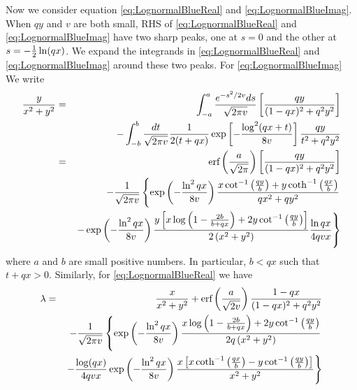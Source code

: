 \documentclass{article}
\begin{document}
Now we consider equation \eqref{eq:LognormalBlueReal} and
\eqref{eq:LognormalBlueImag}. When $q y$ and $v$ are both small, RHS
of \eqref{eq:LognormalBlueReal} and \eqref{eq:LognormalBlueImag} have
two sharp peaks, one at $s = 0$ and the other at $s = -{1 \over
  2}\ln(qx)$. We expand the integrands in
\eqref{eq:LognormalBlueReal} and \eqref{eq:LognormalBlueImag} around
these two peaks. For \eqref{eq:LognormalBlueImag} We write
\begin{eqnarray}
  {y \over x^2 + y^2} &=& \int_{-a}^{a} {e^{-s^2/2v}ds \over
    \sqrt{2\pi v}} \left[\frac{qy}{(1-qx)^2 + q^2y^2}\right] \label{eq:lambda}\\
  && - \int_{-b}^{b} {dt \over \sqrt{2\pi v}} {1 \over 2(t + q x)}
  \exp \left[-\frac{\log ^2(q x+t)}{8v}\right] {qy \over t^2 +
    q^2y^2} \nonumber \\
  &=& \text{erf}\left({a \over \sqrt{2\pi}}\right)\left[\frac{qy}{(1-qx)^2 +
      q^2 y^2}\right] \nonumber \\
  && -{1 \over \sqrt{2\pi v}}\left\{
  \exp\left(-{\ln^2qx \over 8v}\right) \frac{x \cot ^{-1}\left(\frac{q
      y}{b}\right)+y \coth ^{-1}\left(\frac{q x}{b}\right)}{q x^2+q
    y^2} \right. \nonumber \\
  && \left.-\exp\left(-{\ln^2qx \over 8v}\right)
  \frac{y \left[x \log \left(1-\frac{2 b}{b+q x}\right)+2 y
    \cot^{-1}\left(\frac{q y}{b}\right)\right]}{2
    \left(x^2+y^2\right)} {\ln qx \over 4qvx}
  \right\} \nonumber
\end{eqnarray}
where $a$ and $b$ are small positive numbers. In particular, $b < q x$
such that $t + qx > 0$. Similarly, for \eqref{eq:LognormalBlueReal} we have
\begin{eqnarray}
  \lambda &=& {x \over x^2 + y^2} + \text{erf}\left({a \over \sqrt{2v}}\right){1 - q x
    \over (1 - q x)^2 + q^2 y^2 } \nonumber \\
  && - {1 \over \sqrt{2\pi v}}
  \left\{\exp\left(-{\ln^2qx \over 8v}\right) \frac{x \log
    \left(1-\frac{2 b}{b+q x}\right)+2 y \cot ^{-1}\left(\frac{q
      y}{b}\right)}{2 q \left(x^2+y^2\right)} \right. \nonumber \\
  &&  
  \left. -\frac{\log (q x)}{4 q v x} \exp\left(-{\ln^2qx \over
    8v}\right) \frac{x \left[x \coth ^{-1}\left(\frac{q x}{b}\right)-y
    \cot ^{-1}\left(\frac{q y}{b}\right)\right]}{x^2+y^2}
  \right\} \label{eq:constraint}
\end{eqnarray}
\end{document}
